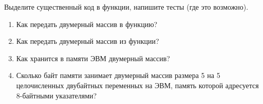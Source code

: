 \labtask

Выделите существенный код в функции, напишите тесты (где это возможно).

\labworkquestions

\begin{enumerate}
	\item
		Как передать двумерный массив в функцию?
	\item
		Как передать двумерный массив из функции?
	\item
		Как хранится в памяти ЭВМ двумерный массив?
	\item
		Сколько байт памяти занимает двумерный массив размера 5 на 5 целочисленных двубайтных переменных на ЭВМ, память которой адресуется 8-байтными указателями? 
\end{enumerate}



